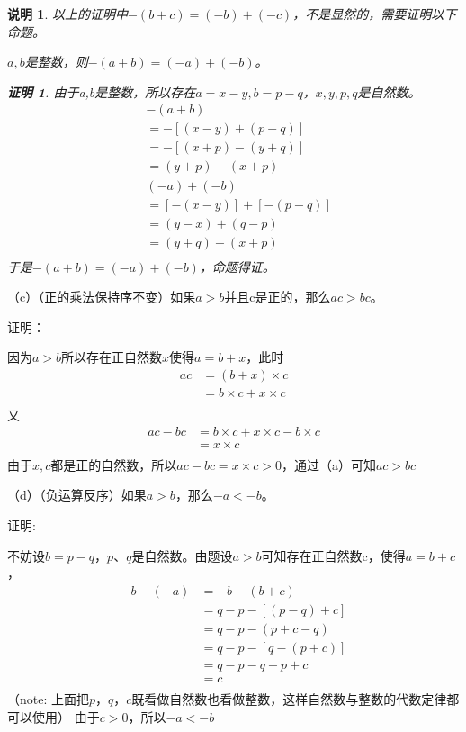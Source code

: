 \documentclass{article}
\theoremstyle{mystyle}
\newtheorem*{zremark}{说明}
\theoremstyle{zproofstyle}
\newtheorem*{zproof}{证明}
\begin{document}
\begin{zgraytheorem}
  \begin{zremark}
    以上的证明中$-(b+c)=(-b)+(-c)$，不是显然的，需要证明以下命题。

    $a,b$是整数，则$-(a+b)=(-a)+(-b)$。
    \begin{zproof}
      由于a,b是整数，所以存在$a=x-y,b=p-q$，$x,y,p,q$是自然数。
      \begin{align*}
         & -(a+b)                \\
         & =-[(x-y)+(p-q)]       \\
         & =-[(x+p)-(y+q)]       \\
         & =(y+p)-(x+p)          \\
         & (-a)+(-b)             \\
         & = [-(x-y)] + [-(p-q)] \\
         & = (y-x) + (q-p)       \\
         & = (y+q) - (x+p)       \\
      \end{align*}
      于是$-(a+b)=(-a)+(-b)$，命题得证。
    \end{zproof}
  \end{zremark}
\end{zgraytheorem}

（c）（正的乘法保持序不变）如果$a>b$并且c是正的，那么$ac > bc$。

证明：

因为$a>b$所以存在正自然数$x$使得$a=b+x$，此时
\begin{align*}
  ac & = (b+x) \times c          \\
     & = b \times c + x \times c \\
\end{align*}
又
\begin{align*}
  ac - bc & = b \times c + x \times c - b \times c \\
          & = x \times c                           \\
\end{align*}
由于$x,c$都是正的自然数，所以$ac-bc = x\times c > 0$，通过（a）可知$ac > bc$

（d）（负运算反序）如果$a > b$，那么$-a < -b$。

证明:

不妨设$b = p - q$，$p$、$q$是自然数。由题设$a > b$可知存在正自然数c，使得$a = b + c$，
\begin{align*}
  -b - (-a) & = -b - (b + c)        \\
            & = q-p - [(p - q) + c] \\
            & = q-p - (p + c - q)   \\
            & = q-p - [q - (p + c)] \\
            & = q-p - q + p + c     \\
            & = c                   \\
\end{align*}
（note: 上面把$p$，$q$，$c$既看做自然数也看做整数，这样自然数与整数的代数定律都可以使用）
由于$c > 0$，所以$-a < -b$
\end{document}
